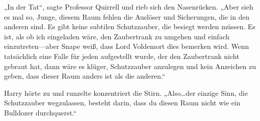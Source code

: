 „In der Tat“, sagte Professor Quirrell und rieb sich den Nasenrücken.
„Aber sieh es mal so, Junge, diesem Raum fehlen die Auslöser und Sicherungen, die in den anderen sind. Es gibt keine subtilen Schutzzauber, die besiegt werden müssen. Es ist, als ob ich eingeladen wäre, den Zaubertrank zu umgehen und einfach einzutreten—aber Snape weiß, dass Lord Voldemort dies bemerken wird. Wenn tatsächlich eine Falle für jeden aufgestellt wurde, der den Zaubertrank nicht gebraut hat, dann wäre es klüger, Schutzzauber anzulegen und kein Anzeichen zu geben, dass dieser Raum anders ist als die anderen.“

Harry hörte zu und runzelte konzentriert die Stirn.
„Also…der einzige Sinn, die Schutzzauber wegzulassen, besteht darin, dass du diesen Raum nicht wie ein Bulldozer durchquerst.“

